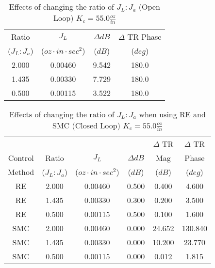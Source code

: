 

\begin{center}
	\begin{table}
	\caption{Effects of changing the ratio of $J_L:J_a$ (Open Loop) $K_c=55.0\frac{oz}{in}$}
	\begin{center}
  \begin{tabular}{  c | c | c | c }

Ratio					& $J_L$										& $\Delta dB$	& $\Delta$ TR Phase \\ 
($J_L:J_a$)		&($oz\cdot in\cdot sec^2$)& ($dB$)			& ($deg$)							\\	\hline
\hline
2.000  				&0.00460  								&9.542  			&180.0							\\	\hline
1.435  				&0.00330  								&7.729  			&180.0							\\	\hline
0.500  				&0.00115  								&3.522  			&180.0							\\

  \end{tabular}
  \end{center}
  \label{table:resultsOpenLoop}
  \end{table}
\end{center}


\begin{center}
	\begin{table}
	\caption{Effects of changing the ratio of $J_L:J_a$ when using RE and SMC (Closed Loop) $K_c=55.0\frac{oz}{in}$}
	\begin{center}
  \begin{tabular}{ c | c | c | c | c | c }
						&								& 												& 								& $\Delta$ TR 		& $\Delta$ TR 			\\ 
Control			&Ratio					& $J_L$										& $\Delta dB$			& Mag 						& Phase 						\\ 
Method			&($J_L:J_a$)		&($oz\cdot in\cdot sec^2$)& ($dB$)					& ($dB$)					& ($deg$)						\\	\hline
\hline
RE 					&2.000  				&0.00460  								&0.500  					&0.400  					&4.600							\\	\hline
RE 					&1.435  				&0.00330  								&0.300  					&0.200  					&3.500							\\	\hline
RE 					&0.500  				&0.00115  								&0.500  					&0.100  					&1.600							\\	\hline
\hline
SMC 				&2.000  				&0.00460  								&0.000  					&24.652  					&130.840						\\	\hline
SMC 				&1.435  				&0.00330  								&0.000  					&10.200  					&23.770							\\	\hline
SMC 				&0.500  				&0.00115  								&0.000  					&0.012  					&1.815							\\	


  \end{tabular}
  \end{center}
  \label{table:resultsClosedLoop}
  \end{table}
\end{center}